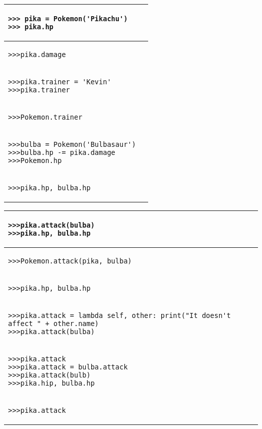 \documentclass{exam}
\begin{document}
\begin{questions}
\begin{center}
\begin{tabular}{ |p{8cm}|p{6cm}| } 
 \hline
 \begin{lstlisting}
>>> pika = Pokemon('Pikachu') 
>>> pika.hp
\end{lstlisting} &  \\  \hline
 \begin{lstlisting}
>>>pika.damage
\end{lstlisting} &  \\  \hline
 \begin{lstlisting}
>>>pika.trainer = 'Kevin'
>>>pika.trainer
\end{lstlisting} &  \\  \hline
 \begin{lstlisting}
>>>Pokemon.trainer
\end{lstlisting} &  \\  \hline
 \begin{lstlisting}
>>>bulba = Pokemon('Bulbasaur')
>>>bulba.hp -= pika.damage
>>>Pokemon.hp
\end{lstlisting} &  \\  \hline
 \begin{lstlisting}
>>>pika.hp, bulba.hp
\end{lstlisting} &  \\  \hline
\end{tabular}
\end{center}
\clearpage
\begin{center}
\begin{tabular}{ |p{8cm}|p{6cm}| } 
 \hline
 \begin{lstlisting}
>>>pika.attack(bulba)
>>>pika.hp, bulba.hp
\end{lstlisting} &  \\  \hline
 \begin{lstlisting}
>>>Pokemon.attack(pika, bulba)
\end{lstlisting} &  \\  \hline
 \begin{lstlisting}
>>>pika.hp, bulba.hp
\end{lstlisting} &  \\  \hline
 \begin{lstlisting}
>>>pika.attack = lambda self, other: print("It doesn't affect " + other.name)
>>>pika.attack(bulba)
\end{lstlisting} &  \\  \hline
 \begin{lstlisting}
>>>pika.attack
>>>pika.attack = bulba.attack
>>>pika.attack(bulb)
>>>pika.hip, bulba.hp
\end{lstlisting} &  \\  \hline
 \begin{lstlisting}
>>>pika.attack
\end{lstlisting} &  \\  \hline
\end{tabular}
\end{center}



\end{questions}
\end{document}
